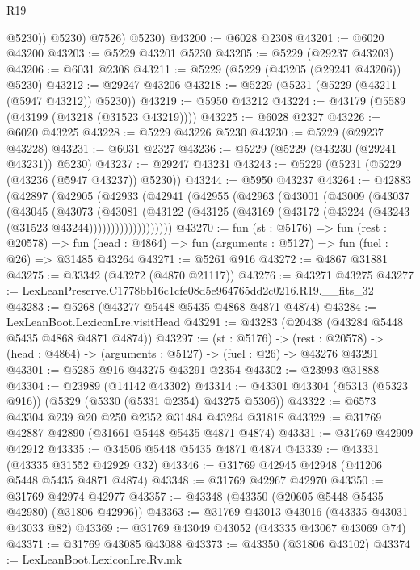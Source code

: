 \begin{lexlean}{R19}
\begin{coremodule}
              @5230))
          @5230)
        @7526)
      @5230)
@43200 := @6028 @2308
@43201 := @6020 @43200
@43203 := @5229 @43201 @5230
@43205 := @5229 (@29237 @43203)
@43206 := @6031 @2308
@43211 := @5229 (@5229 (@43205 (@29241 @43206)) @5230)
@43212 := @29247 @43206
@43218 := @5229 (@5231 (@5229 (@43211 (@5947 @43212)) @5230))
@43219 := @5950 @43212
@43224 := @43179 (@5589 (@43199 (@43218 (@31523 @43219))))
@43225 := @6028 @2327
@43226 := @6020 @43225
@43228 := @5229 @43226 @5230
@43230 := @5229 (@29237 @43228)
@43231 := @6031 @2327
@43236 := @5229 (@5229 (@43230 (@29241 @43231)) @5230)
@43237 := @29247 @43231
@43243 := @5229 (@5231 (@5229 (@43236 (@5947 @43237)) @5230))
@43244 := @5950 @43237
@43264 := @42883
    (@42897
      (@42905
        (@42933
          (@42941
            (@42955
              (@42963
                (@43001
                  (@43009
                    (@43037
                      (@43045
                        (@43073
                          (@43081
                            (@43122
                              (@43125
                                (@43169 (@43172 (@43224 (@43243 (@31523 @43244)))))))))))))))))))
@43270 := fun (st : @5176) =>
  fun (rest : @20578) =>
  fun (head : @4864) => fun (arguments : @5127) => fun (fuel : @26) => @31485 @43264
@43271 := @5261 @916
@43272 := @4867 @31881
@43275 := @33342 (@43272 (@4870 @21117))
@43276 := @43271 @43275
@43277 := LexLeanPreserve.C1778bb16c1cfe08d5e964765dd2c0216.R19.__fits_32
@43283 := @5268 (@43277 @5448 @5435 @4868 @4871 @4874)
@43284 := LexLeanBoot.LexiconLre.visitHead
@43291 := @43283 (@20438 (@43284 @5448 @5435 @4868 @4871 @4874))
@43297 := (st : @5176) ->
  (rest : @20578) -> (head : @4864) -> (arguments : @5127) -> (fuel : @26) -> @43276 @43291
@43301 := @5285 @916 @43275 @43291 @2354
@43302 := @23993 @31888
@43304 := @23989 (@14142 @43302)
@43314 := @43301 @43304 (@5313 (@5323 @916)) (@5329 (@5330 (@5331 @2354) @43275 @5306))
@43322 := @6573 @43304 @239 @20 @250 @2352 @31484 @43264 @31818
@43329 := @31769 @42887 @42890 (@31661 @5448 @5435 @4871 @4874)
@43331 := @31769 @42909 @42912
@43335 := @34506 @5448 @5435 @4871 @4874
@43339 := @43331 (@43335 @31552 @42929 @32)
@43346 := @31769 @42945 @42948 (@41206 @5448 @5435 @4871 @4874)
@43348 := @31769 @42967 @42970
@43350 := @31769 @42974 @42977
@43357 := @43348 (@43350 (@20605 @5448 @5435 @42980) (@31806 @42996))
@43363 := @31769 @43013 @43016 (@43335 @43031 @43033 @82)
@43369 := @31769 @43049 @43052 (@43335 @43067 @43069 @74)
@43371 := @31769 @43085 @43088
@43373 := @43350 (@31806 @43102)
@43374 := LexLeanBoot.LexiconLre.Rv.mk

\end{coremodule}
\end{lexlean}
